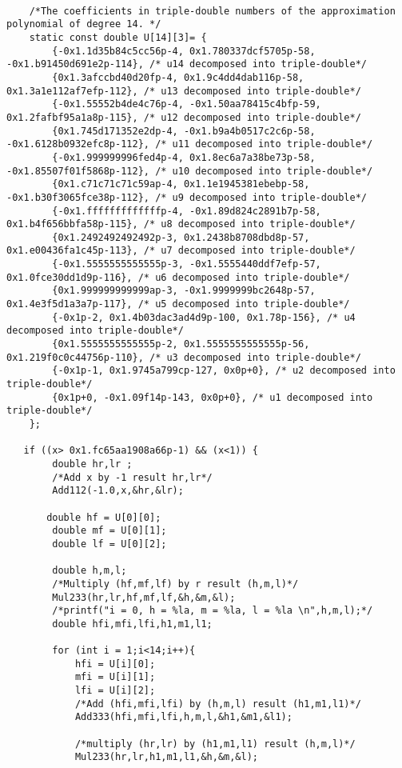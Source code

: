 \begin{lstlisting}
    
    /*The coefficients in triple-double numbers of the approximation polynomial of degree 14. */
    static const double U[14][3]= {
        {-0x1.1d35b84c5cc56p-4, 0x1.780337dcf5705p-58, -0x1.b91450d691e2p-114}, /* u14 decomposed into triple-double*/
        {0x1.3afccbd40d20fp-4, 0x1.9c4dd4dab116p-58, 0x1.3a1e112af7efp-112}, /* u13 decomposed into triple-double*/
        {-0x1.55552b4de4c76p-4, -0x1.50aa78415c4bfp-59, 0x1.2fafbf95a1a8p-115}, /* u12 decomposed into triple-double*/
        {0x1.745d171352e2dp-4, -0x1.b9a4b0517c2c6p-58, -0x1.6128b0932efc8p-112}, /* u11 decomposed into triple-double*/
        {-0x1.999999996fed4p-4, 0x1.8ec6a7a38be73p-58, -0x1.85507f01f5868p-112}, /* u10 decomposed into triple-double*/
        {0x1.c71c71c71c59ap-4, 0x1.1e1945381ebebp-58, -0x1.b30f3065fce38p-112}, /* u9 decomposed into triple-double*/
        {-0x1.fffffffffffffp-4, -0x1.89d824c2891b7p-58, 0x1.b4f656bbfa58p-115}, /* u8 decomposed into triple-double*/
        {0x1.2492492492492p-3, 0x1.2438b8708dbd8p-57, 0x1.e00436fa1c45p-113}, /* u7 decomposed into triple-double*/
        {-0x1.5555555555555p-3, -0x1.5555440ddf7efp-57, 0x1.0fce30dd1d9p-116}, /* u6 decomposed into triple-double*/
        {0x1.999999999999ap-3, -0x1.9999999bc2648p-57, 0x1.4e3f5d1a3a7p-117}, /* u5 decomposed into triple-double*/
        {-0x1p-2, 0x1.4b03dac3ad4d9p-100, 0x1.78p-156}, /* u4 decomposed into triple-double*/
        {0x1.5555555555555p-2, 0x1.5555555555555p-56, 0x1.219f0c0c44756p-110}, /* u3 decomposed into triple-double*/
        {-0x1p-1, 0x1.9745a799cp-127, 0x0p+0}, /* u2 decomposed into triple-double*/
        {0x1p+0, -0x1.09f14p-143, 0x0p+0}, /* u1 decomposed into triple-double*/
    };

   if ((x> 0x1.fc65aa1908a66p-1) && (x<1)) {
        double hr,lr ;
        /*Add x by -1 result hr,lr*/
        Add112(-1.0,x,&hr,&lr);
       
       double hf = U[0][0];
        double mf = U[0][1];
        double lf = U[0][2];
        
        double h,m,l;
        /*Multiply (hf,mf,lf) by r result (h,m,l)*/
        Mul233(hr,lr,hf,mf,lf,&h,&m,&l);
        /*printf("i = 0, h = %la, m = %la, l = %la \n",h,m,l);*/
        double hfi,mfi,lfi,h1,m1,l1;

        for (int i = 1;i<14;i++){
            hfi = U[i][0];
            mfi = U[i][1];
            lfi = U[i][2];
            /*Add (hfi,mfi,lfi) by (h,m,l) result (h1,m1,l1)*/
            Add333(hfi,mfi,lfi,h,m,l,&h1,&m1,&l1);

            /*multiply (hr,lr) by (h1,m1,l1) result (h,m,l)*/
            Mul233(hr,lr,h1,m1,l1,&h,&m,&l);
            

\end{lstlisting}
